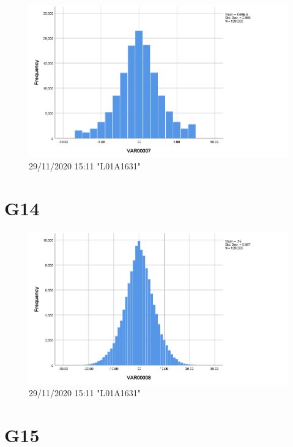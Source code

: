 \documentclass[hidelinks, 12pt, a4paper]{article}
\begin{document}
\begin{figure}[h!]
	\centering
		\includegraphics[height=.38\textheight, width=\textwidth]{assets/session2/g13.png}
		\caption{29/11/2020 15:11 "L01A1631"}
	\end{figure}

\section{G14}
\begin{figure}[h!]
	\centering
		\includegraphics[height=.38\textheight, width=\textwidth]{assets/session2/g14.png}
		\caption{29/11/2020 15:11 "L01A1631"}
	\end{figure}

\section{G15}
\end{document}
